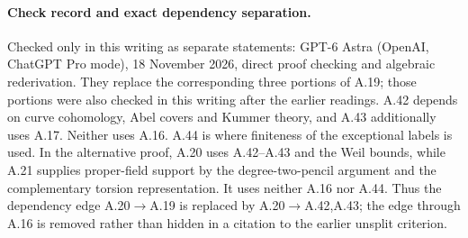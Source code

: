 \paragraph{Check record and exact dependency separation.}
Checked only in this writing as separate statements: GPT-6 Astra
(OpenAI, ChatGPT Pro mode), 18 November 2026, direct proof
checking and algebraic rederivation. They replace the corresponding
three portions of A.19; those portions were also checked in this
writing after the earlier readings. A.42 depends on curve
cohomology, Abel covers and Kummer theory, and A.43 additionally
uses A.17. Neither uses A.16. A.44 is where finiteness of the
exceptional labels is used. In the alternative proof, A.20
uses A.42--A.43 and the Weil bounds, while A.21 supplies
proper-field support by the degree-two-pencil argument and
the complementary torsion representation. It uses neither
A.16 nor A.44. Thus the dependency edge A.20$\to$A.19
is replaced by A.20$\to$A.42,A.43; the edge through A.16
is removed rather than hidden in a citation to the earlier
unsplit criterion.
